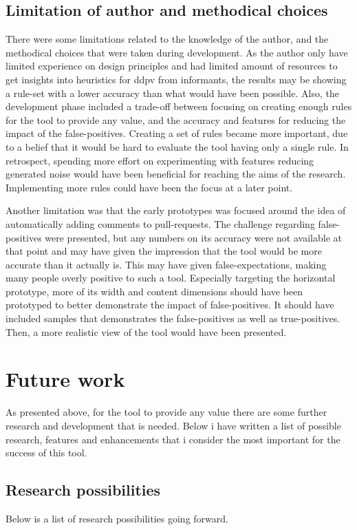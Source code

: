 \documentclass{report}
\begin{document}
\subsection*{Limitation of author and methodical choices}
There were some limitations related to the knowledge of the author, and the methodical choices that were taken during development. As the author only have limited experience on design principles and had limited amount of resources to get insights into heuristics for \gls{ddpv} from informants, the results may be showing a rule-set with a lower accuracy than what would have been possible. Also, the development phase included a trade-off between focusing on creating enough rules for the tool to provide any value, and the accuracy and features for reducing the impact of the false-positives. Creating a set of rules became more important, due to a belief that it would be hard to evaluate the tool having only a single rule. In retrospect, spending more effort on experimenting with features reducing generated noise would have been beneficial for reaching the aims of the research. Implementing more rules could have been the focus at a later point. 

Another limitation was that the early prototypes was focused around the idea of automatically adding comments to pull-requests. The challenge regarding false-positives were presented, but any numbers on its accuracy were not available at that point and may have given the impression that the tool would be more accurate than it actually is. This may have given false-expectations, making many people overly positive to such a tool. Especially targeting the horizontal prototype, more of its width and content dimensions should have been prototyped to better demonstrate the impact of false-positives. It should have included samples that demonstrates the false-positives as well as true-positives. Then, a more realistic view of the tool would have been presented.

\section{Future work}
 As presented above, for the tool to provide any value there are some further research and development that is needed. Below i have written a list of possible research, features and enhancements that i consider the most important for the success of this tool. 
 
 
\subsection{Research possibilities}
Below is a list of research possibilities going forward.
\end{document}
